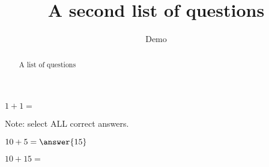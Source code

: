 \documentclass{ximera}
\title{A second list of questions}
\author{Demo}
\begin{document}
\begin{abstract}
    A list of questions
\end{abstract}
\maketitle

\begin{exercise} 

    $1+1=$
    \begin{selectAll}
    \end{selectAll}

    Note: select ALL correct answers.
\end{exercise}

\begin{exercise}
    $10+5=\answer{15}$
\end{exercise}

\begin{exercise}
    $10+15=$
    \begin{multipleChoice}
    \end{multipleChoice}
\end{exercise}
\end{document}
